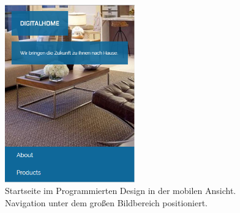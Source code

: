 \begin{figure} [hp]
	\includegraphics[width=0.5\textwidth]{./img/zeitg_struktur3.png}
	\caption{Startseite im Programmierten Design in der mobilen Ansicht. Navigation unter dem großen Bildbereich positioniert.}
	\label{zeitg:struktur3}
\end{figure}